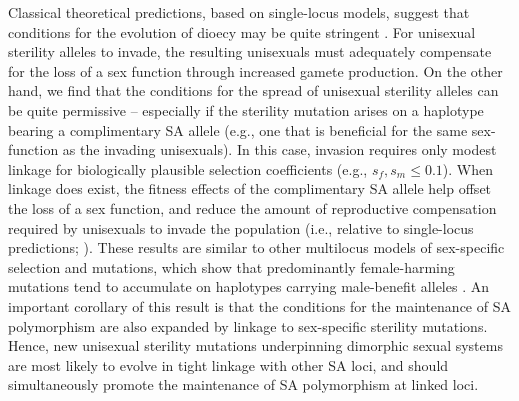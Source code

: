 \documentclass[9pt,twocolumn,twoside,lineno]{gsajnl}
\begin{document}
Classical theoretical predictions, based on single-locus models, suggest that conditions for the evolution of dioecy may be quite stringent \citep{Lloyd1975,Lloyd1976,Charlesworth1978a,KaferPannell2017}. For unisexual sterility alleles to invade, the resulting unisexuals must adequately compensate for the loss of a sex function through increased gamete production. On the other hand, we find that the conditions for the spread of unisexual sterility alleles can be quite permissive -- especially if the sterility mutation arises on a haplotype bearing a complimentary SA allele (e.g., one that is beneficial for the same sex-function as the invading unisexuals). In this case, invasion requires only modest linkage for biologically plausible selection coefficients (e.g., $s_f,s_m \leq 0.1$). When linkage does exist, the fitness effects of the complimentary SA allele help offset the loss of a sex function, and reduce the amount of reproductive compensation required by unisexuals to invade the population (i.e., relative to single-locus predictions; \citealt{Charlesworth1978a}). These results are similar to other multilocus models of sex-specific selection and mutations, which show that predominantly female-harming mutations tend to accumulate on haplotypes carrying male-benefit alleles \citep{ConnallonJordan2016}. An important corollary of this result is that the conditions for the maintenance of SA polymorphism are also expanded by linkage to sex-specific sterility mutations. Hence, new unisexual sterility mutations underpinning dimorphic sexual systems are most likely to evolve in tight linkage with other SA loci, and should simultaneously promote the maintenance of SA polymorphism at linked loci. 
\end{document}
